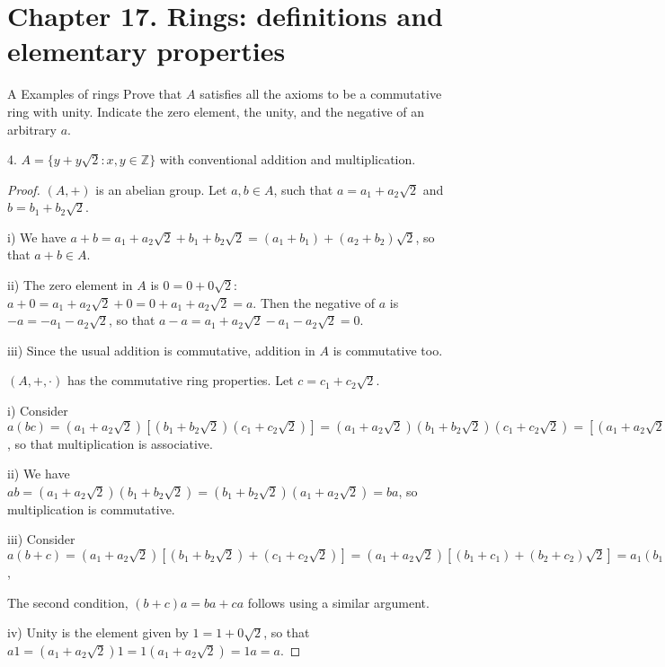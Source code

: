 \section*{Chapter 17. Rings: definitions and elementary properties}


\begin{exercise}{A Examples of rings}
 Prove that $A$ satisfies all the axioms to be a commutative ring with unity. Indicate the zero element, the unity, and the negative of an arbitrary $a$.
 
 4. $A=\{y+y\sqrt{2}:x,y\in \mathbb{Z}\}$ with conventional addition and multiplication.
\end{exercise}
\begin{proof}
 $(A, +)$ is an abelian group. Let $a,b\in A$, such that $a=a_{1}+a_{2}\sqrt{2}$ and $b=b_{1}+b_{2}\sqrt{2}$.

 i) We have $a+b= a_{1}+a_{2}\sqrt{2}+b_{1}+b_{2}\sqrt{2}= (a_{1}+b_{1})+(a_{2}+b_{2})\sqrt{2}$, so that $a+b\in A$.

 ii) The zero element in $A$ is $0= 0+0\sqrt{2}$: $a+0= a_{1}+a_{2}\sqrt{2}+0 = 0+a_{1}+a_{2}\sqrt{2}= a$. Then the negative of $a$ is $-a= -a_{1}-a_{2}\sqrt{2}$, so that $a-a= a_{1}+a_{2}\sqrt{2}-a_{1}-a_{2}\sqrt{2}= 0$.

 iii) Since the usual addition is commutative, addition in $A$ is commutative too.

 $(A, +, \cdot)$ has the commutative ring properties. Let $c= c_{1}+c_{2}\sqrt{2}$.

 i) Consider $a(bc)=(a_{1}+a_{2}\sqrt{2})[(b_{1}+b_{2}\sqrt{2})(c_{1}+c_{2}\sqrt{2})]= (a_{1}+a_{2}\sqrt{2})(b_{1}+b_{2}\sqrt{2})(c_{1}+c_{2}\sqrt{2})= [(a_{1}+a_{2}\sqrt{2})(b_{1}+b_{2}\sqrt{2})](c_{1}+c_{2}\sqrt{2})= (ab)c$, so that multiplication is associative.

 ii) We have $ab= (a_{1}+a_{2}\sqrt{2})(b_{1}+b_{2}\sqrt{2})= (b_{1}+b_{2}\sqrt{2})(a_{1}+a_{2}\sqrt{2})= ba$, so multiplication is commutative.

 iii) Consider $a(b+c)= (a_{1}+a_{2}\sqrt{2})[(b_{1}+b_{2}\sqrt{2})+(c_{1}+c_{2}\sqrt{2})]= (a_{1}+a_{2}\sqrt{2})[(b_{1}+c_{1})+(b_{2}+c_{2})\sqrt{2}]= a_{1}(b_{1}+c_{1})+a_{1}(b_{2}+c_{2})\sqrt{2}] +a_{2}\sqrt{2}(b_{1}+c_{1})+2a_{2}(b_{2}+c_{2})= a_{1}b_{1}+a_{1}c_{1})+a_{1}b_{2}\sqrt{2}+a_{1}c_{2}\sqrt{2}+a_{2}b_{1}\sqrt{2}+a_{2}c_{1}\sqrt{2}+2a_{2}b_{2}+2a_{2}c_{2})= a_{1}b_{1}+a_{1}b_{2}\sqrt{2}+a_{2}b_{1}\sqrt{2}+2a_{2}b_{2}+ a_{1}c_{1})+a_{1}c_{2}\sqrt{2}+a_{2}c_{1}\sqrt{2}+2a_{2}c_{2})= (a_{1}b_{1}+2a_{2}b_{2})+(a_{1}b_{2}+a_{2}b_{1})\sqrt{2}+ (a_{1}c_{1}+2a_{2}c_{2})+(a_{1}c_{2}+a_{2}c_{1})\sqrt{2}= ab+ac$,

 The second condition, $(b+c)a=ba+ca$ follows using a similar argument.

 iv) Unity is the element given by $1=1+0\sqrt{2}$, so that $a1=(a_{1}+a_{2}\sqrt{2})1=1(a_{1}+a_{2}\sqrt{2})=1a=a$.
\end{proof}


